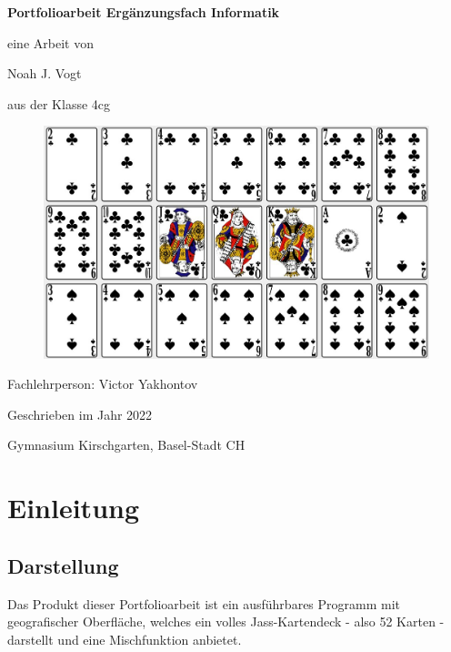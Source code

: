 \documentclass[a4paper,11pt]{article}
\begin{document}
\begin{titlepage}

	\centering

    \vspace{5cm}
    \vspace{0.1cm}
	{\huge\bfseries Portfolioarbeit Ergänzungsfach Informatik \par}
	\vspace{0.5cm}
	{\Large eine Arbeit von \par}
	{\Large Noah J. Vogt \par}
    {\Large aus der Klasse 4cg \par}
    \vspace{0.5cm}

    \begin{figure}[H]
        \centering
        \includegraphics[width=.9\textwidth]{media/card-panel.jpg}
    \end{figure}

    \vspace{0.5cm}
    {\Large Fachlehrperson: Victor Yakhontov \par }
    \vspace{0.5cm}
	{\large Geschrieben im Jahr 2022 \par}
    {\large Gymnasium Kirschgarten, Basel-Stadt CH \par}

\end{titlepage}

\tableofcontents
\pagebreak

\section{Einleitung}
\subsection{Darstellung}
Das Produkt dieser Portfolioarbeit ist ein ausführbares Programm mit geografischer Oberfläche, welches ein volles Jass-Kartendeck - also 52 Karten - darstellt und eine Mischfunktion anbietet.\\
\end{document}
